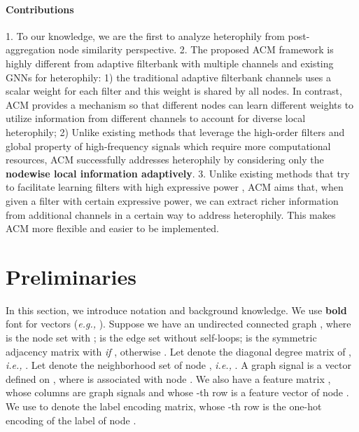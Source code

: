 \documentclass{article}
\newcommand\ie{\textit{i.e.,}}
\newcommand\eg{\textit{e.g.,}}
\newcommand{\0}{{\boldsymbol{0}}}
\newcommand{\6}{{\partial}}
\newcommand{\8}{{\infty}}
\newcommand{\4}{{\nabla}}
\begin{document}
\paragraph{Contributions} 1. To our knowledge, we are the first to analyze heterophily from post-aggregation node similarity perspective. 2. The proposed ACM framework is highly different from adaptive filterbank with multiple channels and existing GNNs for heterophily: 1) the traditional adaptive filterbank channels \cite{vary2006adaptive} uses a scalar weight for each filter and this weight is shared by all nodes. In contrast, ACM provides a mechanism so that different nodes can learn different weights to utilize information from different channels to account for diverse local heterophily; 2) Unlike existing methods that leverage the high-order filters and global property of high-frequency signals \cite{zhu2020beyond,liu2021non,chien2021adaptive, he2021bernnet} which require more computational resources, ACM successfully addresses heterophily by considering only the \textbf{nodewise local information adaptively}.
3. Unlike existing methods that try to facilitate learning filters with high expressive power \cite{zhu2020beyond,zhu2020graph,chien2021adaptive, he2021bernnet}, ACM aims that, when given a filter with certain expressive power, we can extract richer information from additional channels in a certain way to address heterophily. This makes ACM more flexible and easier to be implemented.




\vspace{-0.3cm}
\section{Preliminaries}
\vspace{-0.3cm}
\label{sec:prelimiary_notation}
In this section, we introduce notation and background knowledge. We use \textbf{bold} font for vectors (\eg{} ). Suppose we have an undirected connected graph , where  is the node set with ;  is the edge set without self-loops;  is the symmetric adjacency matrix with  \textit{if} ,
otherwise .
Let  denote the diagonal degree matrix of , \ie{} . Let  denote the neighborhood set of node , \ie{}  . A graph signal is a vector  defined on , where  is associated with node . We also have a feature matrix , whose columns are graph signals and whose -th row   is a feature vector of node . We use  to denote the label encoding matrix, whose -th row   is the one-hot encoding of the label of node . 
\end{document}

